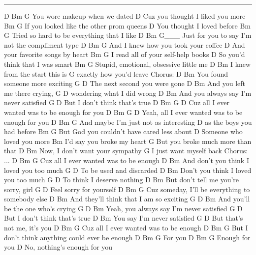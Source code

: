 \noindent\rule{\columnwidth}{1pt}

\begin{multicols}{2}
\begin{lstsong}
D         Bm              G
 You wore makeup when we dated
                            D
Cuz you thought I liked you more
              Bm             G
If you looked like the other prom queens
                    D
You thought I loved before
          Bm              G
Tried so hard to be everything that I like
      D         Bm               G___
Just for you to say I'm not the compliment type
D           Bm                 G
 And I knew how you took your coffee
                             D
And your favorite songs by heart
       Bm                G
I read all of your self-help books 
                           D
So you'd think that I was smart
          Bm          G
Stupid, emotional, obsessive little me
D                 Bm
 I knew from the start this is
 G
exactly how you'd leave
Chorus:
              D          Bm
You found someone more exciting
           G              D
The next second you were gone
D                       Bm
 And you left me there crying,
      G                D
wondering what I did wrong
                D               Bm
And you always say I'm never satisfied
       G                  D
But I don't think that's true
     D          Bm           G              D
Cuz all I ever wanted was to be enough for you
       D           Bm          G            D
Yeah, all I ever wanted was to be enough for you
D          Bm                G
 And maybe I'm just not as interesting
                     D
as the boys you had before
             Bm                  G
But God you couldn't have cared less about
                       D
Someone who loved you more
             Bm
I'd say you broke my heart
          G
But you broke much more than that
     D                   Bm
Now, I don't want your sympathy
        G
I just want myself back
Chorus: ...
     D          Bm           G
Cuz all I ever wanted was to be enough
           D                Bm
And don't you think I loved you too much
       G          D
To be used and discarded
           D                Bm
Don't you think I loved you too much
         G           D
To think I deserve nothing
     D                    Bm
But don't tell me you're sorry, girl
      G           D
Feel sorry for yourself
      D               Bm              G
Cuz someday, I'll be everything to somebody else
                       D        Bm
And they'll think that I am so exciting
G           D                 Bm
 And you'll be the one who's crying
G                  D              Bm
 Yeah, you always say I'm never satisfied
    G                     D
But I don't think that's true
     D              Bm
You say I'm never satisfied
     G                   D
But that's not me, it's you
     D           Bm          G
Cuz all I ever wanted was to be enough
    D               Bm            G
But I don't think anything could ever be enough
    D Bm G
For you
            D  Bm  G
Enough for you
                          D
No, nothing's enough for you
\end{lstsong}
\end{multicols}
\newpage


